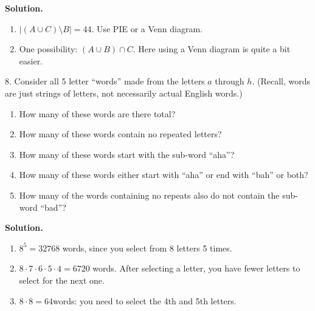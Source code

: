 \documentclass[10pt,]{book}
\theoremstyle{plain}
\theoremstyle{definition}
\theoremstyle{definition}
\theoremstyle{definition}
\numberwithin{equation}{section}
\newcommand{\card}[1]{\left| #1 \right|}
\begin{document}
\begin{exerciselist}
\par\smallskip
\par\smallskip
\noindent\textbf{Solution.}\hypertarget{solution-74}{}\quad

          \leavevmode%
\begin{enumerate}[label=(\alph*)]
\item\hypertarget{li-399}{}\(\card{(A \cup C)\setminus B} = 44\). Use PIE or a Venn diagram.
\item\hypertarget{li-400}{}
              One possibility: \((A \cup B) \cap C\).  Here using a Venn diagram is quite a bit easier.
\end{enumerate}

\item[8.]\hypertarget{exercise-49}{}
          Consider all 5 letter ``words'' made from the letters \(a\) through \(h\). (Recall, words are just strings of letters, not necessarily actual English words.)
\leavevmode%
\begin{enumerate}[label=(\alph*)]
\item\hypertarget{li-401}{}
              How many of these words are there total?
\item\hypertarget{li-402}{}
              How many of these words contain no repeated letters?
\item\hypertarget{li-403}{}
              How many of these words start with the sub-word ``aha''?
\item\hypertarget{li-404}{}
              How many of these words either start with ``aha'' or end with ``bah'' or both?
\item\hypertarget{li-405}{}
              How many of the words containing no repeats also do not contain the sub-word ``bad''?%
\end{enumerate}
\par\smallskip
\par\smallskip
\noindent\textbf{Solution.}\hypertarget{solution-75}{}\quad
\leavevmode%
\begin{enumerate}[label=(\alph*)]
\item\hypertarget{li-406}{}\(8^5 = 32768\) words, since you select from 8 letters 5 times.%
\item\hypertarget{li-407}{}\(8\cdot 7\cdot 6\cdot 5\cdot 4 = 6720\) words. After selecting a letter, you have fewer letters to select for the next one.%
\item\hypertarget{li-408}{}
              \(8 \cdot 8 =64\)words: you need to select the 4th and 5th letters.

\end{enumerate}
\end{exerciselist}
\end{document}
